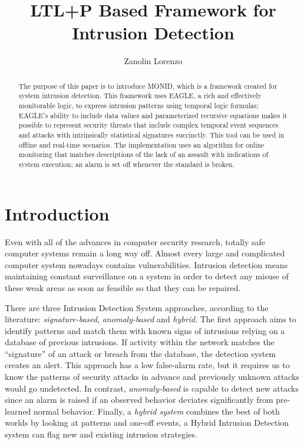 \documentclass[english]{article}
\title{LTL+P Based Framework for Intrusion Detection}
\author{Zanolin Lorenzo}
\begin{document}
\maketitle

\begin{abstract}
The purpose of this paper is to introduce MONID, which is a framework created for system intrusion detection. This framework uses EAGLE, a rich and effectively monitorable logic, to express intrusion patterns using temporal logic formulas; EAGLE's ability to include data values and parameterized recursive equations makes it possible to represent security threats that include complex temporal event sequences and attacks with intrinsically statistical signatures succinctly. This tool can be used in offline and real-time scenarios. The implementation uses an algorithm for online monitoring that matches descriptions of the lack of an assault with indications of system execution; an alarm is set off whenever the standard is broken.
\end{abstract}

\tableofcontents
\newpage

\section{Introduction}
Even with all of the advances in computer security research, totally safe computer systems remain a long way off. Almost every large and complicated computer system nowadays contains vulnerabilities. Intrusion detection means maintaining constant surveillance on a system in order to detect any misuse of these weak areas as soon as feasible so that they can be repaired.

There are three Intrusion Detection System approaches, according to the literature: \textit{signature-based}\cite{gao2014cyber}, \textit{anomaly-based}\cite{jyothsna2011review} and \textit{hybrid}\cite{garg2016hybrid}. The first approach aims to identify patterns and match them with known signs of intrusions relying on a database of previous intrusions. If activity within the network matches the “signature” of an attack or breach from the database, the detection system creates an alert. This approach has a low false-alarm rate, but it requires us to know the patterns of security attacks in advance and previously unknown attacks would go undetected. In contrast, \textit{anomaly-based} is capable to detect new attacks since an alarm is raised if an observed behavior deviates significantly from pre-learned normal behavior. Finally, a \textit{hybrid system} combines the best of both worlds by looking at patterns and one-off events, a Hybrid Intrusion Detection system can flag new and existing intrusion strategies. 
\end{document}

